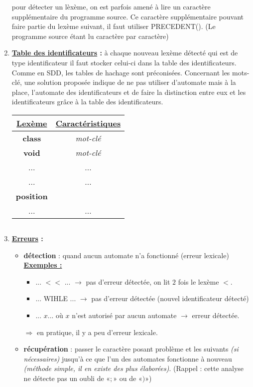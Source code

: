 \documentclass{article}
\newcommand{\stitre}[1]{\noindent\textbf{\underline{#1}}}
\begin{document}
\begin{enumerate}
pour détecter un lèxème, on est parfois amené à lire un caractère supplémentaire du programme source. Ce caractère supplémentaire pouvant faire partie du lexème suivant, il 
faut utiliser PRECEDENT(). (Le programme source étant lu caractère par caractère)
\item \textbf{\underline{Table des identificateurs} :} à chaque nouveau lexème détecté qui est de type identificateur il faut stocker celui-ci dans la table des identificateurs. 
Comme en SDD, les tables de hachage sont préconisées. Concernant les mots-clé, une solution proposée indique de ne pas utiliser d'automate mais à la place, l'automate des 
identificateurs et de faire la distinction entre eux et les identificateurs grâce à la table des identificateurs.
\begin{center}
	\begin{tabular}{|c|c|}
	 \hline
	 \textbf{\underline{Lexème}} & \textbf{\underline{Caractéristiques}} \\
	 \hline
	 \textbf{class} & \textit{mot-clé} \\
	 \textbf{void} & \textit{mot-clé} \\
	 ... & ... \\
	 ... & ... \\
	 \textbf{position} & \\
	 ... & ... \\
	 \hline
	\end{tabular}
\end{center}
$ $ \\
$ $ \\
\item \textbf{\underline{Erreurs} :} 
\begin{itemize}
\item \textbf{détection} : quand aucun automate n'a fonctionné (erreur lexicale) \\
\stitre{Exemples :}
\begin{itemize}
\item ... $< <$ ... $\rightarrow$ pas d'erreur détectée, on lit $2$ fois le lexème $<$.
\item ... WIHLE ... $\rightarrow$ pas d'erreur détectée (nouvel identificateur détecté)
\item ... $x$... où $x$ n'est autorisé par aucun automate $\rightarrow$ erreur détectée.
\end{itemize}
$\Rightarrow$ en pratique, il y a peu d'erreur lexicale.
\item \textbf{récupération} : passer le caractère posant problème et les suivants \textit{(si nécessaires)} jusqu'à ce que l'un des automates fonctionne à nouveau 
\textit{(méthode simple, il en existe des plus élaborées)}. (Rappel : cette analyse ne détecte pas un oubli de «$;$» ou de «$)$»)
\end{itemize}
\end{enumerate}
 \newpage
\end{document}

